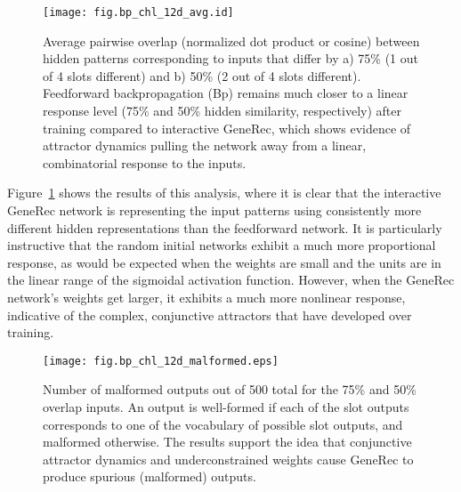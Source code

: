 \documentclass[12pt,twoside]{article}
\begin{document}
\begin{figure}
  \centering\texttt{[image: fig.bp\_chl\_12d\_avg.id]}
  \caption{\small Average pairwise overlap (normalized dot product or
    cosine) between hidden patterns corresponding to inputs that
    differ by a) 75\% (1 out of 4 slots different) and b) 50\% (2 out
    of 4 slots different).  Feedforward backpropagation (Bp) remains
    much closer to a linear response level (75\% and 50\% hidden
    similarity, respectively) after training compared to interactive
    GeneRec, which shows evidence of attractor dynamics pulling the
    network away from a linear, combinatorial response to the inputs.}
  \label{fig.bp_chl_12d_avg}
\end{figure}

Figure~\ref{fig.bp_chl_12d_avg} shows the results of this analysis,
where it is clear that the interactive GeneRec network is representing
the input patterns using consistently more different hidden
representations than the feedforward network.  It is particularly
instructive that the random initial networks exhibit a much more
proportional response, as would be expected when the weights are small
and the units are in the linear range of the sigmoidal activation
function.  However, when the GeneRec network's weights get larger, it
exhibits a much more nonlinear response, indicative of the complex,
conjunctive attractors that have developed over training.

\begin{figure}
  \centering\texttt{[image: fig.bp\_chl\_12d\_malformed.eps]}
  \caption{\small Number of malformed outputs out of 500 total for the
    75\% and 50\% overlap inputs.  An output is well-formed if each of
    the slot outputs corresponds to one of the vocabulary of possible
    slot outputs, and malformed otherwise.  The results support the
    idea that conjunctive attractor dynamics and underconstrained
    weights cause GeneRec to produce spurious (malformed) outputs.}
  \label{fig.bp_chl_12d_malformed}
\end{figure}
\end{document}
